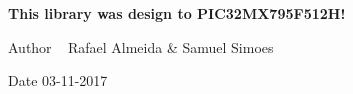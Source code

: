 {\bfseries  This library was design to P\+I\+C32\+M\+X795\+F512\+H! \begin{DoxyAuthor}{Author}
~\newline
 Rafael Almeida \& Samuel Simoes 
\end{DoxyAuthor}
\begin{DoxyDate}{Date}
03-\/11-\/2017 
\end{DoxyDate}
}